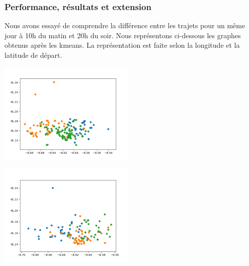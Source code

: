 \documentclass[]{report}
\begin{document}
	\subsubsection{Performance, résultats et extension}
	Nous avons essayé de comprendre la différence entre les trajets pour un même jour à 10h du matin et 20h du soir. Nous représentons ci-dessous les graphes obtenus après les kmeans. La représentation est faite selon la longitude et la latitude de départ.\\
	\begin{minipage}{.5\textwidth}
		\includegraphics[width=65mm]{Figures/kmeans_10AM.png}
	\end{minipage}%
	\hspace{0.02\linewidth}
	\begin{minipage}{.5\textwidth}
		\includegraphics[width=65mm]{Figures/kmeans_8PM.png}
	\end{minipage}
	
\end{document}
